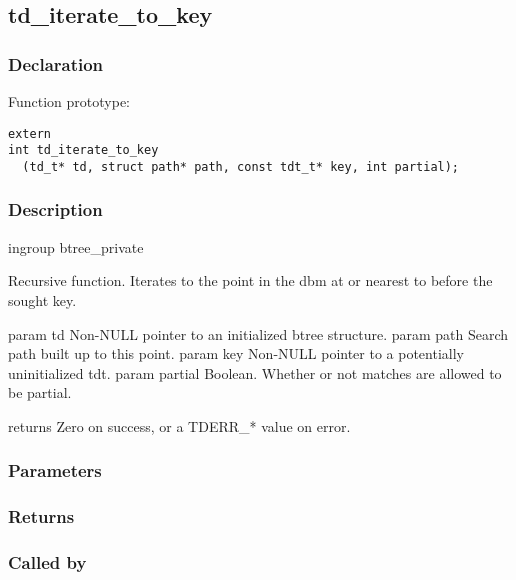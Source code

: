 
\newpage
\subsection{td\_iterate\_to\_key}
\subsubsection{Declaration} Function prototype:

\begin{verbatim}
extern
int td_iterate_to_key
  (td_t* td, struct path* path, const tdt_t* key, int partial);
\end{verbatim}

\subsubsection{Description}


 ingroup btree\_private

 Recursive function.
 Iterates to the point in the dbm at or nearest to before the sought key.

 param td Non-NULL pointer to an initialized btree structure.
 param path Search path built up to this point.
 param key Non-NULL pointer to a potentially uninitialized tdt.
 param partial Boolean. Whether or not matches are allowed to be partial.

 returns Zero on success, or a TDERR\_* value on error.
 

\subsubsection{Parameters}
\subsubsection{Returns}
\subsubsection{Called by}
